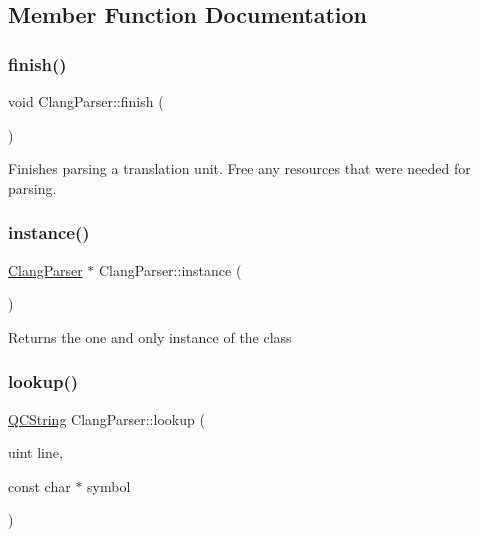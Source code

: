 \subsection{Member Function Documentation}
\mbox{\label{class_clang_parser_ac7ccfd4ea36fc8c347e8f794109678c8}} 
\subsubsection{\texorpdfstring{finish()}{finish()}}
{\footnotesize\ttfamily void Clang\+Parser\+::finish (\begin{DoxyParamCaption}{ }\end{DoxyParamCaption})}

Finishes parsing a translation unit. Free any resources that were needed for parsing. \mbox{\label{class_clang_parser_add1060dd5febd4664f6038a87d87b8cd}} 
\subsubsection{\texorpdfstring{instance()}{instance()}}
{\footnotesize\ttfamily \mbox{\hyperlink{class_clang_parser}{Clang\+Parser}} $\ast$ Clang\+Parser\+::instance (\begin{DoxyParamCaption}{ }\end{DoxyParamCaption})\hspace{0.3cm}{\ttfamily [static]}}

Returns the one and only instance of the class \mbox{\label{class_clang_parser_a2617d0cd62525f13d53a896247ac75d6}} 
\subsubsection{\texorpdfstring{lookup()}{lookup()}}
{\footnotesize\ttfamily \mbox{\hyperlink{class_q_c_string}{Q\+C\+String}} Clang\+Parser\+::lookup (\begin{DoxyParamCaption}\item[{uint}]{line,  }\item[{const char $\ast$}]{symbol }\end{DoxyParamCaption})}

